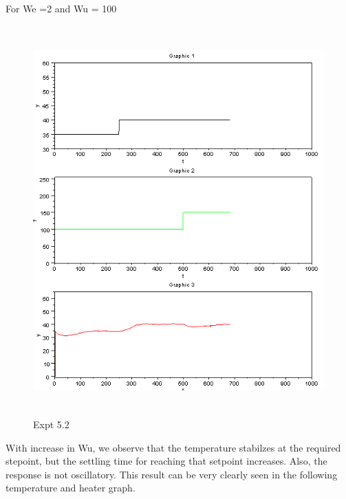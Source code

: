 For We =2 and Wu = 100
\begin{figure}[H]
  \includegraphics[width=12cm, height=15cm]{mpc/5_2.PNG}
  \caption{Expt 5.2}
\end{figure}
With increase in Wu, we observe that the temperature stabilzes at the required stepoint, but the settling time for reaching that setpoint increases. Also, the response is not oscillatory. This result can be very clearly seen in the following temperature and heater graph.
